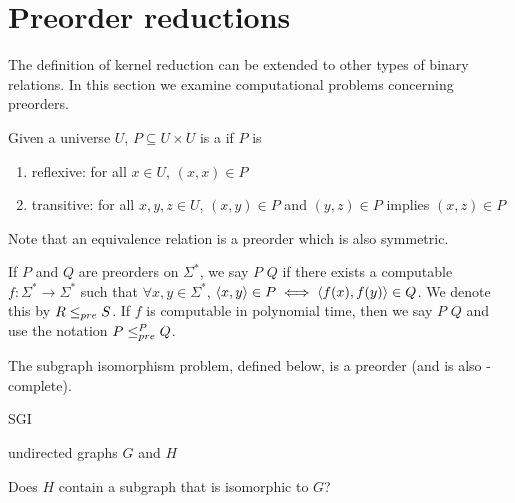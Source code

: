 \section{Preorder reductions}

The definition of kernel reduction can be extended to other types of binary relations.
In this section we examine computational problems concerning preorders.

Given a universe $U$, $P\subseteq U\times U$ is a  if $P$ is
\begin{enumerate}
\item reflexive: for all $x\in U$, $(x,x)\in P$
\item transitive: for all $x,y,z\in U$, $(x,y)\in P$ and $(y,z)\in P$ implies $(x,z)\in P$
\end{enumerate}
Note that an equivalence relation is a preorder which is also symmetric.

If $P$ and $Q$ are preorders on $\Sigma^*$, we say $P$  $Q$ if there exists a computable $f\colon\Sigma^*\to\Sigma^*$ such that $\forall x,y\in\Sigma^*$, $\langle x,y\rangle\in P\iff \langle f(x),f(y)\rangle\in Q$.
We denote this by $R\leq_{pre} S$.
If $f$ is computable in polynomial time, then we say $P$  $Q$ and use the notation $P\leq^{P}_{pre} Q$.

The subgraph isomorphism problem, defined below, is a preorder (and is also \NP-complete\cite{gj79}).
\begin{langdef}{SGI}
\begin{instance}
  undirected graphs $G$ and $H$
\end{instance}
\begin{question}
  Does $H$ contain a subgraph that is isomorphic to $G$?
\end{question}
\end{langdef}

